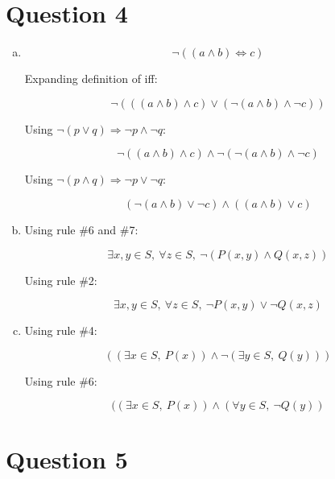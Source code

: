 \documentclass[12pt]{article}
\begin{document}
\section*{Question 4}
    \begin{enumerate}[a)]
        \item
        \begin{equation}
            \neg ((a \land b) \Leftrightarrow c)
        \end{equation}

        Expanding definition of iff:

        \begin{equation}
            \neg (((a\land b) \land c) \lor (\neg (a \land b) \land \neg c))
        \end{equation}

        Using $\neg(p \lor q) \Rightarrow \neg p \land \neg q$:

        \begin{equation}
            \neg((a\land b) \land c) \land \neg (\neg (a \land b) \land \neg c)
        \end{equation}

        Using $\neg(p \land q) \Rightarrow \neg p \lor \neg q$:

        \begin{equation}
            (\neg(a\land b) \lor \neg c) \land ((a \land b) \lor c)
        \end{equation}

        \item
        Using rule \#6 and \#7:

        \setcounter{equation}{0}
        \begin{equation}
            \exists x,y \in S,\: \forall z \in S,\:\neg (P(x,y) \land Q(x,z))
        \end{equation}

        Using rule \#2:

        \begin{equation}
            \exists x,y \in S,\: \forall z \in S,\:\neg P(x,y) \lor \neg Q(x,z)
        \end{equation}

        \item
        Using rule \#4:

        \setcounter{equation}{0}
        \begin{equation}
            ((\exists x \in S,\:P(x)) \land \neg (\exists y \in S,\:Q(y)))
        \end{equation}

        Using rule \#6:

        \begin{equation}
            ((\exists x \in S,\:P(x)) \land (\forall y \in S,\:\neg Q(y))
        \end{equation}

    \end{enumerate}

\section*{Question 5}
\end{document}
